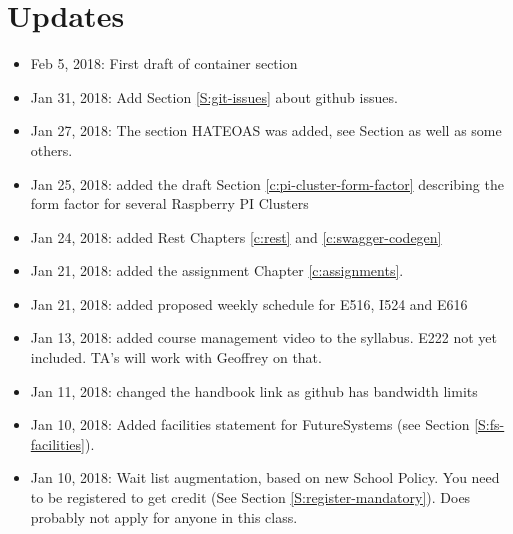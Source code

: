 
\chapter{Updates}

\begin{itemize}

\item Feb 5, 2018: First draft of container section
\item Jan 31, 2018: Add Section \ref{S:git-issues} about github issues.
\item Jan 27, 2018: The section HATEOAS was added, see
  Section \label{s:hateoas} as well as some others.
\item Jan 25, 2018: added the draft Section
  \ref{c:pi-cluster-form-factor} describing the form factor for
  several Raspberry PI Clusters

\item Jan 24, 2018: added Rest Chapters \ref{c:rest} and
  \ref{c:swagger-codegen}
 
\item Jan 21, 2018: added the assignment Chapter \ref{c:assignments}.

\item Jan 21, 2018: added proposed weekly schedule for E516, I524 and
  E616

\item Jan 13, 2018: added course management video to the
  syllabus. E222 not yet included. TA's will work with Geoffrey on
  that.

\item Jan 11, 2018: changed the handbook link as github has bandwidth
  limits

\item Jan 10, 2018: Added facilities statement for FutureSystems (see
  Section \ref{S:fs-facilities}).

\item Jan 10, 2018: Wait list augmentation, based on new School
  Policy. You need to be registered to get credit (See Section
  \ref{S:register-mandatory}). Does probably not apply for anyone in
  this class.

\end{itemize}
